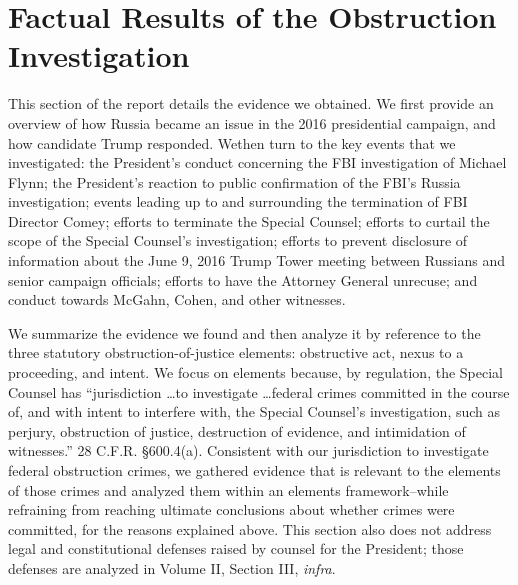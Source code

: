 \section{Factual Results of the Obstruction Investigation}
This section of the report details the evidence we obtained. 
We first provide an overview of how Russia became an issue in the 2016 presidential campaign, and how candidate Trump responded. 
Wethen turn to the key events that we investigated: the President's conduct concerning the FBI investigation of Michael Flynn; the President's reaction to public confirmation of the FBI's Russia investigation; events leading up to and surrounding the termination of FBI Director Comey; efforts to terminate the Special Counsel; efforts to curtail the scope of the Special Counsel's investigation; efforts to prevent disclosure of information about the June 9, 2016 Trump Tower meeting between Russians and senior campaign officials; efforts to have the Attorney General unrecuse; and conduct towards McGahn, Cohen, and other witnesses.
 
We summarize the evidence we found and then analyze it by reference to the three statutory obstruction-of-justice elements: obstructive act, nexus to a proceeding, and intent. 
We focus on elements because, by regulation, the Special Counsel has ``jurisdiction \dots to investigate \dots federal crimes committed in the course of, and with intent to interfere with, the Special Counsel's investigation, such as perjury, obstruction of justice, destruction of evidence, and intimidation of witnesses.'' 
28 C.F.R. \S 600.4(a). 
Consistent with our jurisdiction to investigate federal obstruction crimes, we gathered evidence that is relevant to the elements of those crimes and analyzed them within an elements framework--while refraining from reaching ultimate conclusions about whether crimes were committed, for the reasons explained above. 
This section also does not address legal and constitutional defenses raised by counsel for the President; those defenses are analyzed in Volume II, Section III, \textit{infra}.

